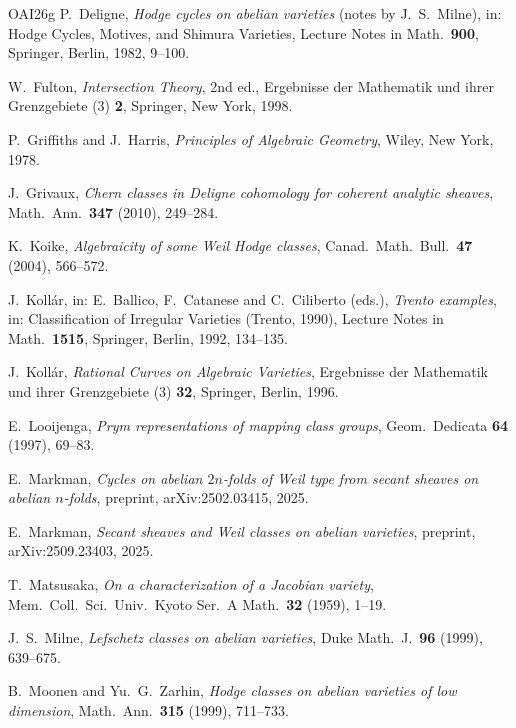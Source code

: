\begin{thebibliography}{OAI26g}
P.~Deligne, \emph{Hodge cycles on abelian varieties} (notes by
J.~S.~Milne), in: Hodge Cycles, Motives, and Shimura Varieties, Lecture
Notes in Math.\ \textbf{900}, Springer, Berlin, 1982, 9--100.

W.~Fulton, \emph{Intersection Theory}, 2nd ed., Ergebnisse der Mathematik
und ihrer Grenzgebiete (3) \textbf{2}, Springer, New York, 1998.

P.~Griffiths and J.~Harris, \emph{Principles of Algebraic Geometry}, Wiley,
New York, 1978.

J.~Grivaux, \emph{Chern classes in Deligne cohomology for coherent analytic
sheaves}, Math.\ Ann.\ \textbf{347} (2010), 249--284.

K.~Koike, \emph{Algebraicity of some Weil Hodge classes}, Canad.\ Math.\
Bull.\ \textbf{47} (2004), 566--572.

J.~Koll\'ar, in: E.~Ballico, F.~Catanese and C.~Ciliberto (eds.),
\emph{Trento examples}, in: Classification of Irregular Varieties (Trento,
1990), Lecture Notes in Math.\ \textbf{1515}, Springer, Berlin, 1992,
134--135.

J.~Koll\'ar, \emph{Rational Curves on Algebraic Varieties}, Ergebnisse der
Mathematik und ihrer Grenzgebiete (3) \textbf{32}, Springer, Berlin, 1996.

E.~Looijenga, \emph{Prym representations of mapping class groups}, Geom.\
Dedicata \textbf{64} (1997), 69--83.

E.~Markman, \emph{Cycles on abelian $2n$-folds of Weil type from secant
sheaves on abelian $n$-folds}, preprint, arXiv:2502.03415, 2025.

\bibitem[Mar25b]{Mar25b}
E.~Markman, \emph{Secant sheaves and Weil classes on abelian varieties},
preprint, arXiv:2509.23403, 2025.

T.~Matsusaka, \emph{On a characterization of a Jacobian variety}, Mem.\
Coll.\ Sci.\ Univ.\ Kyoto Ser.\ A Math.\ \textbf{32} (1959), 1--19.

\bibitem[Mil99]{Mil99}
J.~S.~Milne, \emph{Lefschetz classes on abelian varieties}, Duke Math.\ J.\
\textbf{96} (1999), 639--675.

\bibitem[MZ99]{MZ99}
B.~Moonen and Yu.~G.~Zarhin, \emph{Hodge classes on abelian varieties of
low dimension}, Math.\ Ann.\ \textbf{315} (1999), 711--733.


\end{thebibliography}
